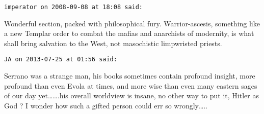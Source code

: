 \begin{footnotesize}\begin{sffamily}



\texttt{imperator on 2008-09-08 at 18:08 said: }

Wonderful section, packed with philosophical fury. Warrior-ascesis, something like a new Templar order to combat the mafias and anarchists of modernity, is what shall bring salvation to the West, not masochistic limpwristed priests.


\hfill

\texttt{JA on 2013-07-25 at 01:56 said: }

Serrano was a strange man, his books sometimes contain profound insight, more profound than even Evola at times, and more wise than even many eastern sages of our day yet…….his overall worldview is insane, no other way to put it, Hitler as God ? I wonder how such a gifted person could err so wrongly…..


\end{sffamily}\end{footnotesize}
